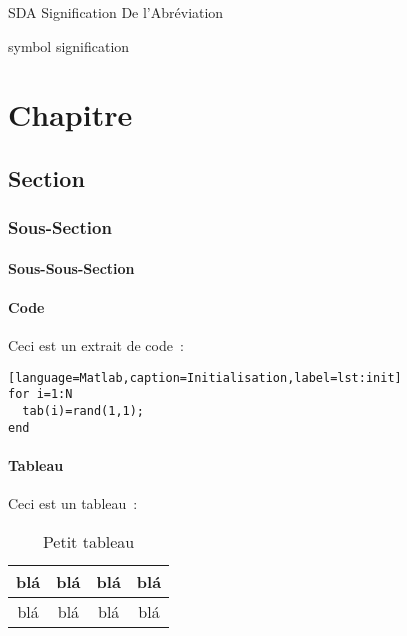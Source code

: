 \documentclass [memoire, letterpaper, oneside, fleqn,12pt]{thETS-utf8}
\begin{document}
\begin{listofabbr}[3cm]
\item[SDA] Signification De l'Abréviation
\end{listofabbr}

\begin{listofsymbols}[3cm]
\item[symbol] signification
\end{listofsymbols}

\newpage
{}

\reversemarginpar %

\begin{introduction}

\end{introduction}

\chapter{Chapitre}
\section{Section}
\subsection{Sous-Section}
\subsubsection{Sous-Sous-Section}

\subsubsection{Code}
Ceci est un extrait de code~:
\begin{lstlisting}
[language=Matlab,caption=Initialisation,label=lst:init]
for i=1:N
  tab(i)=rand(1,1);
end
\end{lstlisting}

\subsubsection{Tableau}
Ceci est un tableau~:
\begin{table}[ht]
    \begin{tabular}{|c|c|c|c|}\hline
      blá & blá & blá & blá \\\hline
      blá & blá & blá & blá \\\hline
    \end{tabular}
  \caption{Petit tableau}
  \label{tab:UnTableau}
\end{table}
\end{document}
